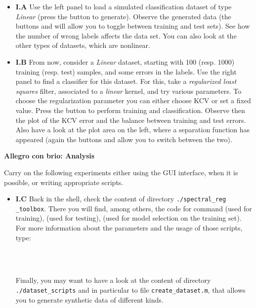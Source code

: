 \documentclass[DIN, pagenumber=false, fontsize=11pt, parskip=half]{scrartcl}
\newcommand{\mysection}[1]{\noindent\large\textbf{#1}}
\begin{document}
\begin{itemize}
	\item \textbf{I.A} Use the left panel to load  a simulated classification dataset of type \textit{Linear} (press the button  to generate).
	Observe the generated data (the buttons  and  will allow you to toggle between training and test sets).
	See how the number of wrong labels affects the data set.
	You can also look at the other types of datasets, which are nonlinear.
	\item \textbf{I.B} From now, consider a \textit{Linear} dataset, starting with 100 (resp. 1000) training (resp. test) samples, and some errors in the labels.
	Use the right panel to find a  classifier for this dataset.
	For this, take a \textit{regularized least squares} filter, associated to a \textit{linear} kernel, and try various parameters.
	To choose the regularization parameter you can either choose KCV or set a fixed value.
	Press the button  to perform training and classification.
	Observe then the plot of the KCV error and the balance between training and test errors.
	Also have a look at the plot area on the left, where a separation function has appeared (again the buttons  and  allow you to switch between the two).
\end{itemize}








\mysection{Allegro con brio: Analysis}

Carry on the following experiments either using the GUI interface, when it is possible, or writing appropriate scripts.

\begin{itemize}
	\item \textbf{I.C} Back in the shell, check the content of directory \texttt{./spectral\_reg} \texttt{\_toolbox}.
	There you will find, among others, the code for command  (used for training),  (used for testing),  (used for model selection on the training set).
For more information about the parameters and the usage of those scripts, type:

\\
\\


Finally, you may want to have a look at the content of directory \texttt{./dataset\_scripts} and in particular to file \texttt{create\_dataset.m}, that  allows you to generate synthetic data of different kinds.
\end{itemize}
\end{document}

